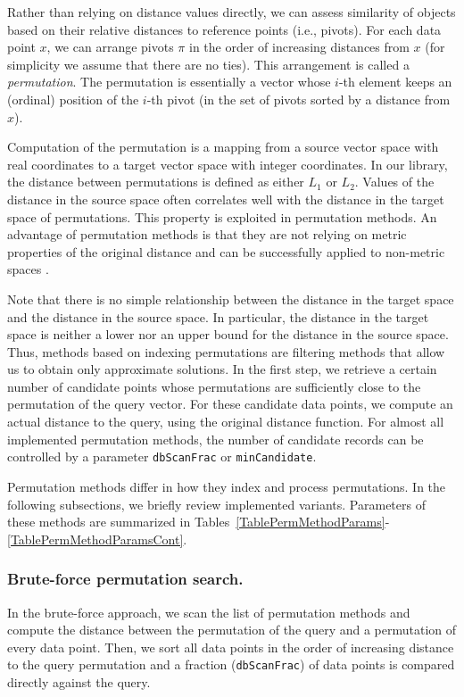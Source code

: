 \documentclass[runningheads,a4paper]{llncs}
\newcommand{\ttt}[1]{\texttt{#1}}
\begin{document}
{Rather than relying on distance values directly,
we can assess similarity of objects based on their
relative distances to reference points (i.e., pivots).
For each data point $x$,
we can arrange pivots $\pi$ in the order of increasing distances from $x$ (for
simplicity we assume that there are no ties).
This arrangement is called a \emph{permutation}.
The permutation is essentially a vector whose \mbox{$i$-th}
element keeps an (ordinal) position of the \mbox{$i$-th} pivot (in the set of pivots
sorted by a distance from $x$).

Computation of the permutation
is a mapping from a source vector space with real coordinates to a target vector space with integer coordinates. 
In our library, the distance between permutations is defined as either $L_1$ or $L_2$.
Values of the distance in the source space often correlates well with the distance in the target space
of permutations.
This property is exploited in permutation methods.
An advantage of permutation methods is that they are not relying on metric properties of the original distance 
and can be successfully applied to non-metric spaces \cite{Boytsov_and_Bilegsaikhan:nips2013,naidan2015permutation}.

Note that there is no simple relationship between the distance in the target space
and the distance in the source space. In particular, the distance in the target space is neither a lower nor an upper bound
for the distance in the source space.
Thus, methods based on indexing permutations are filtering methods that allow us to obtain only approximate solutions.
In the first step, we retrieve a certain number of candidate points whose permutations are sufficiently close
to the permutation of the query vector.
For these candidate data points, we compute an actual distance to the query, using the original distance function.
For almost all implemented permutation methods, 
the number of candidate records can be controlled by a parameter \ttt{dbScanFrac} or \ttt{minCandidate}.


Permutation methods differ in how they index and process permutations.
In the following subsections, we briefly review implemented variants.
Parameters of these methods are summarized in Tables~\ref{TablePermMethodParams}-\ref{TablePermMethodParamsCont}.

\subsubsection{Brute-force permutation search.}
In the brute-force approach, we scan the list of permutation methods and compute the distance
between the permutation of the query and a permutation of every data point.
Then, we sort all data points in the order of increasing distance to the query permutation
and a fraction (\ttt{dbScanFrac}) of data points is compared directly against the query.

}
\end{document}
